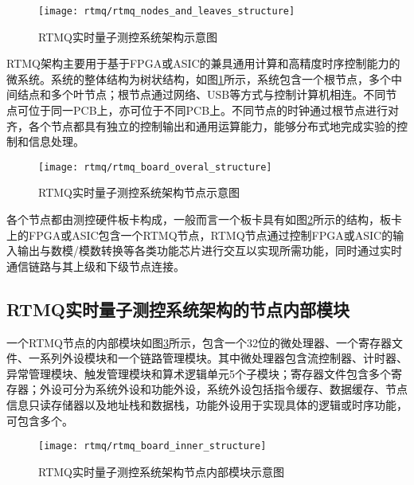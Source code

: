 \begin{figure}
    \centering
    \caption[RTMQ实时量子测控系统架构示意图]{RTMQ实时量子测控系统架构示意图\label{fig:rtmq_nodes_and_leaves_structure}}
    \texttt{[image: rtmq/rtmq\_nodes\_and\_leaves\_structure]}
\end{figure}

RTMQ架构主要用于基于FPGA或ASIC的兼具通用计算和高精度时序控制能力的微系统。系统的整体结构为树状结构，如图\ref{fig:rtmq_nodes_and_leaves_structure}所示，系统包含一个根节点，多个中间结点和多个叶节点；根节点通过网络、USB等方式与控制计算机相连。不同节点可位于同一PCB上，亦可位于不同PCB上。不同节点的时钟通过根节点进行对齐，各个节点都具有独立的控制输出和通用运算能力，能够分布式地完成实验的控制和信息处理。

\begin{figure}
    \centering
    \caption[RTMQ实时量子测控系统架构节点示意图]{RTMQ实时量子测控系统架构节点示意图\label{fig:rtmq_board_overal_structure}}
    \texttt{[image: rtmq/rtmq\_board\_overal\_structure]}
\end{figure}

各个节点都由测控硬件板卡构成，一般而言一个板卡具有如图\ref{fig:rtmq_board_overal_structure}所示的结构，板卡上的FPGA或ASIC包含一个RTMQ节点，RTMQ节点通过控制FPGA或ASIC的输入输出与数模/模数转换等各类功能芯片进行交互以实现所需功能，同时通过实时通信链路与其上级和下级节点连接。



\subsection[RTMQ实时量子测控系统架构的节点内部模块]{RTMQ实时量子测控系统架构的节点内部模块\label{section:rtmq_inner_module}}



一个RTMQ节点的内部模块如图\ref{fig:rtmq_board_inner_structure}所示，包含一个32位的微处理器、一个寄存器文件、一系列外设模块和一个链路管理模块。其中微处理器包含流控制器、计时器、异常管理模块、触发管理模块和算术逻辑单元5个子模块；寄存器文件包含多个寄存器；外设可分为系统外设和功能外设，系统外设包括指令缓存、数据缓存、节点信息只读存储器以及地址栈和数据栈，功能外设用于实现具体的逻辑或时序功能，可包含多个。

\begin{figure}
    \centering
    \caption[RTMQ实时量子测控系统架构节点内部模块示意图]{RTMQ实时量子测控系统架构节点内部模块示意图\label{fig:rtmq_board_inner_structure}}
    \texttt{[image: rtmq/rtmq\_board\_inner\_structure]}
\end{figure}

